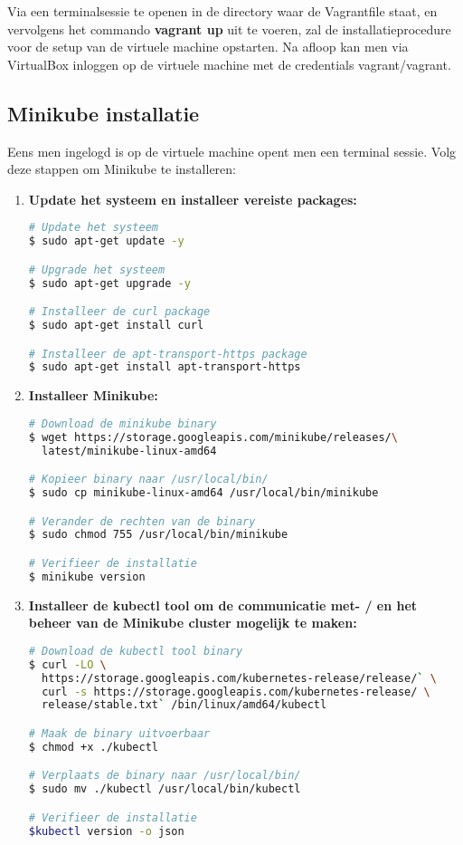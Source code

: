 Via een terminalsessie te openen in de directory waar de Vagrantfile staat, en vervolgens het commando {\bf vagrant up} uit te voeren, zal de installatieprocedure voor de setup van de virtuele machine opstarten. Na afloop kan men via VirtualBox inloggen op de virtuele machine met de credentials vagrant/vagrant. 


\subsection{Minikube installatie}

Eens men ingelogd is op de virtuele machine opent men een terminal sessie. 
Volg deze stappen om Minikube te installeren: \autocite{Simic2020}
\begin{enumerate}
  \item {\bf Update het systeem en installeer vereiste packages:}
\begin{lstlisting}[language=bash]
# Update het systeem
$ sudo apt-get update -y

# Upgrade het systeem
$ sudo apt-get upgrade -y

# Installeer de curl package
$ sudo apt-get install curl

# Installeer de apt-transport-https package
$ sudo apt-get install apt-transport-https

\end{lstlisting}

  \item {\bf Installeer Minikube:}
\begin{lstlisting}[language=bash]
# Download de minikube binary
$ wget https://storage.googleapis.com/minikube/releases/\
  latest/minikube-linux-amd64

# Kopieer binary naar /usr/local/bin/
$ sudo cp minikube-linux-amd64 /usr/local/bin/minikube

# Verander de rechten van de binary 
$ sudo chmod 755 /usr/local/bin/minikube

# Verifieer de installatie
$ minikube version

\end{lstlisting}

  \item {\bf Installeer de kubectl tool om de communicatie met- / en het beheer van de Minikube cluster mogelijk te maken:}
\begin{lstlisting}[language=bash]
# Download de kubectl tool binary
$ curl -LO \
  https://storage.googleapis.com/kubernetes-release/release/` \
  curl -s https://storage.googleapis.com/kubernetes-release/ \
  release/stable.txt` /bin/linux/amd64/kubectl

# Maak de binary uitvoerbaar
$ chmod +x ./kubectl

# Verplaats de binary naar /usr/local/bin/
$ sudo mv ./kubectl /usr/local/bin/kubectl

# Verifieer de installatie
$kubectl version -o json

\end{lstlisting}  
\end{enumerate} 

